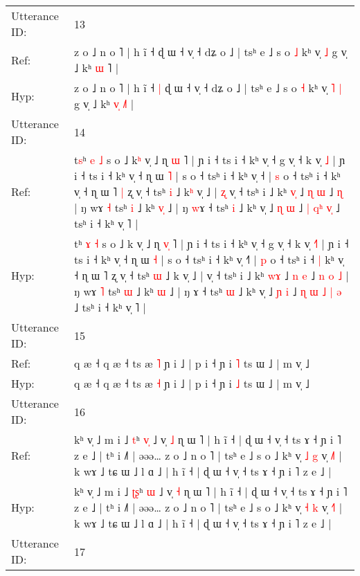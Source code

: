 \documentclass[10pt]{article}
\DeclareRobustCommand{\hl}[1]{{\textcolor{red}{#1}}}
\begin{document}
\begin{longtable}{ll}
\midrule
Utterance ID: & 13 \\
Ref: & z o ˩ n o ˥ | h ĩ ˧\hl{}\hl{} ɖ ɯ ˧ v̩ ˧ dʑ o ˩ | tsʰ e ˩ s o \hl{˩} kʰ v̩\hl{}\hl{} \hl{˩} g v̩ ˩ kʰ \hl{}\hl{ɯ} \hl{}˥ |
 \\
Hyp: & z o ˩ n o ˥ | h ĩ ˧\hl{ }\hl{|} ɖ ɯ ˧ v̩ ˧ dʑ o ˩ | tsʰ e ˩ s o \hl{˧} kʰ v̩\hl{ }\hl{˥} \hl{|} g v̩ ˩ kʰ \hl{v}\hl{̩} \hl{˩}˥ |
 \\
\midrule
Utterance ID: & 14 \\
Ref: & t\hl{s}ʰ \hl{e} \hl{˩} s o ˩ k\hl{ʰ} v̩ ˩ ɳ \hl{}\hl{ɯ} ˥ | ɲ i ˧ ts i ˧ kʰ v̩ ˧ g v̩ ˧ k v̩ \hl{}\hl{˩} | ɲ i ˧ ts i ˧ kʰ v̩ ˧ ɳ ɯ \hl{˥} | s o ˧ tsʰ i ˧ kʰ v̩ ˧\hl{} | \hl{s} o ˧ tsʰ i ˧\hl{}\hl{} kʰ v̩ ˧ ɳ ɯ ˥\hl{ }\hl{|} ʐ v̩ ˧ tsʰ \hl{i} ˩ k\hl{ʰ} v̩ ˩ |\hl{ }\hl{ʐ} v̩ ˧ tsʰ i ˩ kʰ \hl{v}\hl{̩} ˩ \hl{ɳ} \hl{ɯ} ˩\hl{}\hl{}\hl{}\hl{} \hl{ɳ} | ŋ wɤ \hl{˧} tsʰ \hl{i} ˩ kʰ \hl{v}\hl{̩} ˩ | ŋ \hl{w}ɤ ˧ tsʰ \hl{i} ˩ kʰ v̩ ˩ \hl{ɳ} \hl{ɯ} ˩ \hl{|} \hl{}\hl{q}\hl{ʰ} \hl{}\hl{v}\hl{̩} ˩ tsʰ i ˧ kʰ v̩ ˥ |
 \\
Hyp: & t\hl{}ʰ \hl{ɤ} \hl{˧} s o ˩ k\hl{} v̩ ˩ ɳ \hl{v}\hl{̩} ˥ | ɲ i ˧ ts i ˧ kʰ v̩ ˧ g v̩ ˧ k v̩ \hl{˧}\hl{˥} | ɲ i ˧ ts i ˧ kʰ v̩ ˧ ɳ ɯ \hl{˧} | s o ˧ tsʰ i ˧ kʰ v̩ ˧\hl{˥} | \hl{p} o ˧ tsʰ i ˧\hl{ }\hl{|} kʰ v̩ ˧ ɳ ɯ ˥\hl{}\hl{} ʐ v̩ ˧ tsʰ \hl{ɯ} ˩ k\hl{} v̩ ˩ |\hl{}\hl{} v̩ ˧ tsʰ i ˩ kʰ \hl{w}\hl{ɤ} ˩ \hl{n} \hl{e} ˩\hl{ }\hl{n}\hl{ }\hl{o} \hl{˩} | ŋ wɤ \hl{˥} tsʰ \hl{ɯ} ˩ kʰ \hl{}\hl{ɯ} ˩ | ŋ \hl{}ɤ ˧ tsʰ \hl{ɯ} ˩ kʰ v̩ ˩ \hl{ɲ} \hl{i} ˩ \hl{ɳ} \hl{ɯ}\hl{ }\hl{˩} \hl{|}\hl{ }\hl{ə} ˩ tsʰ i ˧ kʰ v̩ ˥ |
 \\
\midrule
Utterance ID: & 15 \\
Ref: & q æ ˧ q æ ˧ ts æ \hl{˥} ɲ i ˩ | p i ˧ ɲ i \hl{˥} ts ɯ ˩ | m v̩ ˩
 \\
Hyp: & q æ ˧ q æ ˧ ts æ \hl{˧} ɲ i ˩ | p i ˧ ɲ i \hl{˩} ts ɯ ˩ | m v̩ ˩
 \\
\midrule
Utterance ID: & 16 \\
Ref: & kʰ v̩ ˩ m i ˩ \hl{}\hl{t}ʰ \hl{v}\hl{̩} ˩ v̩ \hl{˩} ɳ ɯ ˥ | h ĩ ˧ | ɖ ɯ ˧ v̩ ˧ ts ɤ ˧ ɲ i ˥ z e ˩ | tʰ i ˩˥ | əəə… z o ˩ n o ˥ | tsʰ e ˩ s o ˩ kʰ v̩ \hl{˩} \hl{g} v̩ \hl{˩}˥ | k wɤ ˩ tɕ ɯ ˩ l ɑ ˩ | h ĩ ˧ | ɖ ɯ ˧ v̩ ˧ ts ɤ ˧ ɲ i ˥ z e ˩ |
 \\
Hyp: & kʰ v̩ ˩ m i ˩ \hl{ʈ}\hl{ʂ}ʰ \hl{}\hl{ɯ} ˩ v̩ \hl{˧} ɳ ɯ ˥ | h ĩ ˧ | ɖ ɯ ˧ v̩ ˧ ts ɤ ˧ ɲ i ˥ z e ˩ | tʰ i ˩˥ | əəə… z o ˩ n o ˥ | tsʰ e ˩ s o ˩ kʰ v̩ \hl{˧} \hl{k} v̩ \hl{˧}˥ | k wɤ ˩ tɕ ɯ ˩ l ɑ ˩ | h ĩ ˧ | ɖ ɯ ˧ v̩ ˧ ts ɤ ˧ ɲ i ˥ z e ˩ |
 \\
\midrule
Utterance ID: & 17 \\

\end{longtable}
\end{document}
